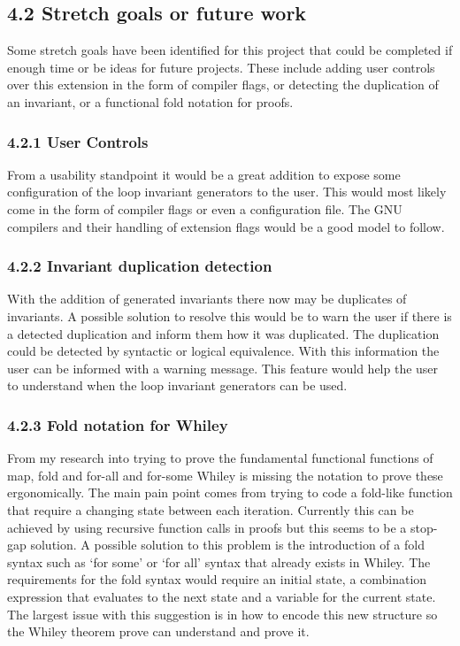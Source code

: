 \documentclass[11pt, a4paper, twoside, openright]{report}
\begin{document}
\subsection*{4.2 Stretch goals or future work}

Some stretch goals have been identified for this project that could
be completed if enough time or be ideas for future projects.
These include adding user controls over this extension in the
form of compiler flags, or detecting the duplication of an invariant,
or a functional fold notation for proofs.

\subsubsection*{4.2.1 User Controls}
From a usability standpoint it would be a great addition to expose
some configuration of the loop invariant generators to the user.
This would most likely come in the form of compiler flags or even
a configuration file. The GNU compilers and their handling of
extension flags would be a good model to follow.

\subsubsection*{4.2.2 Invariant duplication detection}
With the addition of generated invariants there now may be
duplicates of invariants. A possible solution to resolve this would
be to warn the user if there is a detected duplication and
inform them how it was duplicated.
The duplication could be detected by syntactic or logical equivalence.
With this information the user can be informed with a warning message.
This feature would help the user to understand when the loop invariant
generators can be used.

\subsubsection*{4.2.3 Fold notation for Whiley}
From my research into trying to prove the fundamental functional functions of
map, fold and for-all and for-some Whiley is missing the notation to prove
these ergonomically. The main pain point comes from trying to code a fold-like
function that require a changing state between each iteration. Currently this
can be achieved by using recursive function calls in proofs but this seems to
be a stop-gap solution. A possible solution to this problem is the
introduction of a fold syntax such as `for some' or `for all' syntax that
already exists in Whiley. The requirements for the fold syntax would require
an initial state, a combination expression that evaluates to the next state
and a variable for the current state.
The largest issue with this suggestion is in how to encode this new structure
so the Whiley theorem prove can understand and prove it.
\end{document}
